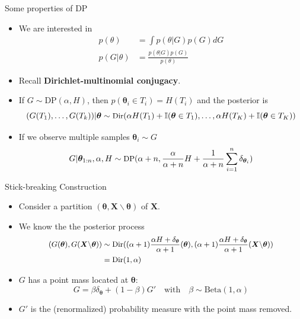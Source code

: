 \documentclass[10pt,mathserif]{beamer}
\begin{document}
\begin{frame}{Some properties of DP}
\begin{itemize}
    \item We are interested in
    \begin{equation*}
        \begin{split}
            p(\theta) & = \int p(\theta|G)p(G)dG \\
            p(G|\theta) & = \frac{p(\theta|G)p(G)}{p(\theta)}
        \end{split}    
    \end{equation*}
    \item Recall \textbf{Dirichlet-multinomial conjugacy}.
    \item If $G\sim\text{DP}(\alpha,H)$, then $p(\bm{\theta}_i\in T_i) = H(T_i)$ and the posterior is
    \begin{equation*}\small
        (G(T_1),\ldots,G(T_k))|\bm{\theta} \sim  \text{Dir}(\alpha H(T_1) + \mathbb{I}(\bm{\theta}\in T_1),\ldots, \alpha H(T_K)+ \mathbb{I}(\bm{\theta}\in T_K))
    \end{equation*}
    \item If we observe multiple samples $\bm{\theta}_i\sim G$
    \begin{equation*}\small
        G|\bm{\theta}_{1:n},\alpha,H \sim \text{DP}(\alpha + n, \frac{\alpha}{\alpha+n}H + \frac{1}{\alpha+n}\sum_{i=1}^n\delta_{\bm{\theta}_i})
    \end{equation*}
\end{itemize}    
\end{frame}

\begin{frame}{Stick-breaking Construction}
\begin{itemize}
    \item Consider a partition $(\bm{\theta}, \bm{X}\backslash\bm{\theta})$ of $\bm{X}$.
    \item We know the the posterior process
    \begin{equation*}\small
        \begin{split}
            (G(\bm{\theta}),G(\bm{X}\backslash\bm{\theta})) & \sim 
            \text{Dir}((\alpha+1)\frac{\alpha H + \delta_{\bm{\theta}}}{\alpha+1}(\bm{\theta}),(\alpha+1)\frac{\alpha H + \delta_{\bm{\theta}}}{\alpha+1}(\bm{X}\backslash\bm{\theta}))\\
            & = \text{Dir}(1,\alpha)
        \end{split}
    \end{equation*}
    \item $G$ has a point mass located at $\bm{\theta}$:
    \begin{equation*}
        G = \beta\delta_{\bm{\theta}} + (1-\beta)G' \quad \text{with} \quad \beta\sim\text{Beta}(1,\alpha)
    \end{equation*}
    \item $G'$ is the (renormalized) probability measure with the point mass removed.
\end{itemize}    
\end{frame}
\end{document}
